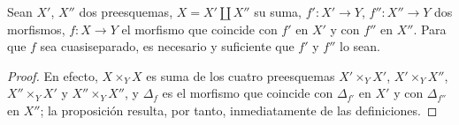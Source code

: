 \begin{proposition}[1.2.9]
\label{IV.1.2.9-fr}
Sean $X'$, $X''$ dos preesquemas, $X=X'\coprod X''$ su suma,
$f':X'\to Y$, $f'':X''\to Y$ dos morfismos, $f:X\to Y$ el morfismo que
coincide con $f'$ en $X'$ y con $f''$ en $X''$. Para que $f$ sea
cuasiseparado, es necesario y suficiente que $f'$ y $f''$ lo sean.
\end{proposition}

\begin{proof}
En efecto, $X\times_YX$ es suma de los cuatro preesquemas
$X'\times_YX'$, $X'\times_YX''$, $X''\times_YX'$ y $X''\times_YX''$, y
$\Delta_f$ es el morfismo que coincide con $\Delta_{f'}$ en $X'$ y con
$\Delta_{f''}$ en $X''$; la proposición resulta, por tanto, inmediatamente de las
definiciones.
\end{proof}

